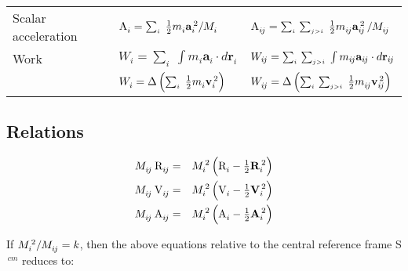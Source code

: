\documentclass[10pt]{article}
\newcommand{\vR}{\mathbf{r}}
\newcommand{\vV}{\mathbf{v}}
\newcommand{\vA}{\mathbf{a}}
\newcommand{\VR}{\mathbf{R}}
\newcommand{\VV}{\mathbf{V}}
\newcommand{\VA}{\mathbf{A}}
\newcommand{\ER}{\mathrm{R}}
\newcommand{\EV}{\mathrm{V}}
\newcommand{\EA}{\mathrm{A}}
\newcommand{\mM}{m}
\newcommand{\EM}{M}
\newcommand{\EW}{W}
\newcommand{\ri}{_i}
\newcommand{\dos}{^{\,2}}
\newcommand{\ccc}{^{\,cm}}
\newcommand{\rij}{_{i\hspace{-0.081em}j}}
\begin{document}
\begin{center}
\begin{tabular}{lll}
Scalar acceleration & $\EA\ri^{\vphantom{\dos}} = \sum_{\scriptscriptstyle i} \; \frac{1}{2}\mM\ri^{\vphantom{\dos}}\vA\ri\dos / \EM\ri^{\vphantom{\dos}}$ & $\EA\rij^{\vphantom{\dos}} = \sum_{\scriptscriptstyle i} \, \sum_{\scriptscriptstyle j>i} \; \frac{1}{2}\mM\rij^{\vphantom{\dos}}\vA\rij\dos \, / \EM\rij^{\vphantom{\dos}}$ \hspace{-0.6em} \vspace{+0.9em} \\
Work & $\EW\ri = \sum_{\scriptscriptstyle i} \; \int \mM\ri\vA\ri \cdot d\vR\ri$ & $\EW\rij = \sum_{\scriptscriptstyle i} \, \sum_{\scriptscriptstyle j>i} \; \int \mM\rij\vA\rij \cdot d\vR\rij$ \hspace{-0.6em} \vspace{+0.3em} \\
& $\EW\ri^{\vphantom{\dos}} = \Delta \left( \sum_{\scriptscriptstyle i} \; \frac{1}{2}\mM\ri^{\vphantom{\dos}}\vV\ri\dos \right)$ & $\EW\rij^{\vphantom{\dos}} = \Delta \left( \sum_{\scriptscriptstyle i} \, \sum_{\scriptscriptstyle j>i} \; \frac{1}{2}\mM\rij^{\vphantom{\dos}}\vV\rij\dos \right)$ \hspace{-0.6em}
\end{tabular}
\end{center}

\vspace{-1.2em}

{\centering\subsection*{Relations}}

\vspace{-1.5em}

\begin{eqnarray*}
\EM\rij^{\vphantom{\dos}} \: \ER\rij^{\vphantom{\dos}} & = & \EM\ri\dos \left( \ER\ri^{\vphantom{\dos}} - {\textstyle \frac{1}{2}}\VR\ri\dos \right) \\
\EM\rij^{\vphantom{\dos}} \: \EV\rij^{\vphantom{\dos}} & = & \EM\ri\dos \left( \EV\ri^{\vphantom{\dos}} - {\textstyle \frac{1}{2}}\VV\ri\dos \right) \\
\EM\rij^{\vphantom{\dos}} \: \EA\rij^{\vphantom{\dos}} & = & \EM\ri\dos \left( \EA\ri^{\vphantom{\dos}} - {\textstyle \frac{1}{2}}\VA\ri\dos \right)
\end{eqnarray*}

\vspace{-0.3em}

\par If $\EM\ri\dos / \EM\rij^{\vphantom{\dos}} = k$, then the above equations relative to the central reference frame S$\ccc$ reduces to:
\end{document}
